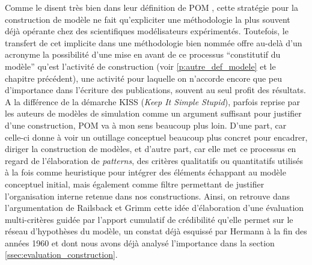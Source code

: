 Comme le disent très bien \textcite{Railsback2012} dans leur définition de POM , cette stratégie pour la construction de modèle ne fait qu'expliciter une méthodologie la plus souvent déjà opérante chez des scientifiques modélisateurs expérimentés. Toutefois, le transfert de cet implicite dans une méthodologie bien nommée offre au-delà d'un acronyme la possibilité d'une mise en avant de ce processus \enquote{constitutif du modèle} qu'est l'activité de construction (voir \ref{p:autre_def_modele} et le chapitre précédent), une activité pour laquelle on n'accorde encore que peu d'importance dans l'écriture des publications, souvent au seul profit des résultats. A la différence de la démarche KISS (\textit{Keep It Simple Stupid}), parfois reprise par les auteurs de modèles de simulation comme un argument suffisant pour justifier d'une construction, POM va à mon sens beaucoup plus loin. D'une part, car celle-ci donne à voir un outillage conceptuel beaucoup plus concret pour encadrer, diriger la construction de modèles, et d'autre part, car elle met ce processus en regard de l'élaboration de \textit{patterns}, des critères qualitatifs ou quantitatifs utilisés à la fois comme heuristique pour intégrer des éléments échappant au modèle conceptuel initial, mais également comme filtre permettant de justifier l'organisation interne retenue dans nos constructions. Ainsi, on retrouve dans l'argumentation de Railsback et Grimm cette idée d'élaboration d'une évaluation multi-critères guidée par l'apport cumulatif de crédibilité qu'elle permet sur le réseau d'hypothèses du modèle, un constat déjà esquissé par Hermann à la fin des années 1960 et dont nous avons déjà analysé l'importance dans la section \ref{ssec:evaluation_construction}. 


